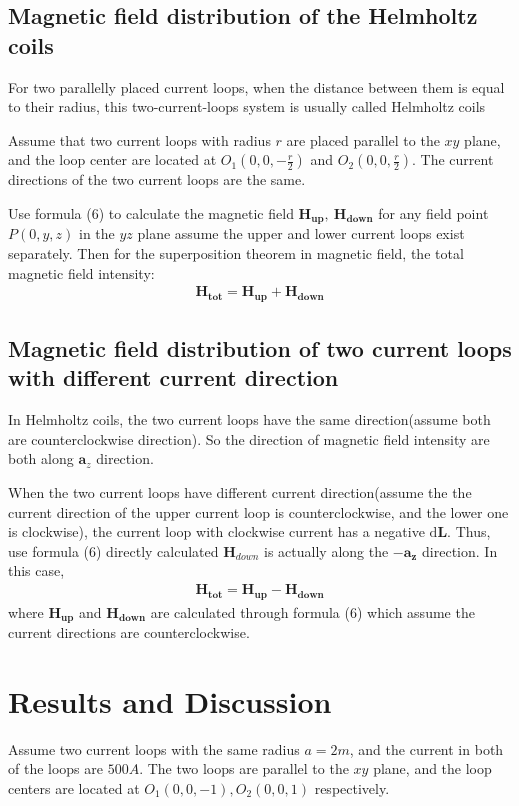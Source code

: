 \documentclass[journal,twocolumn,letterpaper]{IEEEJERM}
\begin{document}
\subsection{Magnetic field distribution of the  Helmholtz coils }
For two parallelly placed current loops, when the distance between them is equal to their radius, this two-current-loops system is usually called Helmholtz coils

Assume that two current loops with radius $ r $ are placed parallel to the $ xy $ plane, and the loop center are located at $ O_1(0,0,-\frac{r}{2}) $ and $ O_2(0,0,\frac{r}{2}) $.  The current directions of the two current loops are the same.

Use formula (6) to calculate the magnetic field $ \mathbf{H_{up}},\ \mathbf{H_{down}} $ for any field point $P(0,y,z)  $ in the $ yz $ plane assume the upper and lower current loops exist separately. Then for the superposition theorem in magnetic field, the total magnetic field intensity:
\begin{align}
\mathbf{H_{tot}}=\mathbf{H_{up}}+\mathbf{H_{down}}
\end{align}

\subsection{Magnetic field distribution of two current loops with different current direction }
In Helmholtz coils, the two current loops have the same direction(assume both are counterclockwise direction). So the  direction of magnetic field intensity are both along $ \mathbf{a}_z $ direction.

When the two current loops have different current direction(assume the the current direction of the upper current loop is counterclockwise, and the lower one is clockwise), the current loop with clockwise current has a negative $ \mathrm{d}\mathbf{L} $. Thus, use formula (6) directly calculated $ \mathbf{H}_{down} $ is actually along the $ -\mathbf{a_z} $ direction. In this case, 
\begin{align}
	\mathbf{H_{tot}}=\mathbf{H_{up}}-\mathbf{H_{down}}
\end{align}
where $ \mathbf{H_{up}} $ and $ \mathbf{H_{down}} $ are calculated through formula (6) which assume the current directions are counterclockwise.

\section{Results and Discussion}
Assume two current loops with the same radius $ a = 2m $, and the current in both of the loops are $ 500A $. The two loops are parallel to the $ xy $ plane, and the loop centers are located at $  O_1(0,0,-1), O_2(0,0,1) $ respectively. 
\end{document}
